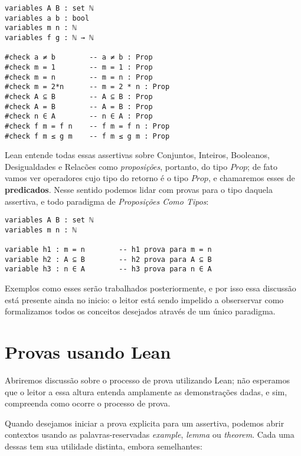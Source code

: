 \vspace{5mm}
\begin{lstlisting}
variables A B : set ℕ
variables a b : bool
variables m n : ℕ
variables f g : ℕ → ℕ

#check a ≠ b        -- a ≠ b : Prop
#check m = 1        -- m = 1 : Prop
#check m = n        -- m = n : Prop
#check m = 2*n      -- m = 2 * n : Prop
#check A ⊆ B        -- A ⊆ B : Prop
#check A = B        -- A = B : Prop
#check n ∈ A        -- n ∈ A : Prop
#check f m = f n    -- f m = f n : Prop
#check f m ≤ g m    -- f m ≤ g m : Prop
\end{lstlisting}
\vspace{5mm}

\noindent Lean entende todas essas assertivas sobre Conjuntos, Inteiros, Booleanos, Desigualdades e Relacões como \textit{proposições}, portanto, do tipo $Prop$; de fato vamos ver operadores cujo tipo do retorno é o tipo $Prop$, e chamaremos esses de \textbf{predicados}.
Nesse sentido podemos lidar com provas para o tipo daquela assertiva, e todo paradigma de \textit{Proposições Como Tipos}:

\vspace{5mm}
\begin{lstlisting}
variables A B : set ℕ
variables m n : ℕ

variable h1 : m = n        -- h1 prova para m = n
variable h2 : A ⊆ B        -- h2 prova para A ⊆ B
variable h3 : n ∈ A        -- h3 prova para n ∈ A
\end{lstlisting}
\vspace{5mm}

Exemplos como esses serão trabalhados posteriormente, e por isso essa discussão está presente ainda no inicio: o leitor está sendo impelido a obserservar como formalizamos todos os conceitos desejados através de um único paradigma.

\section{Provas usando Lean}
Abriremos discussão sobre o processo de prova utilizando Lean; não esperamos que o leitor a essa altura entenda amplamente as demonstrações dadas, e sim, compreenda como ocorre o processo de prova.

Quando desejamos iniciar a prova explicita para um assertiva, podemos abrir contextos usando as palavras-reservadas \textit{example}, \textit{lemma} ou \textit{theorem}. Cada uma dessas tem sua utilidade distinta, embora semelhantes:

